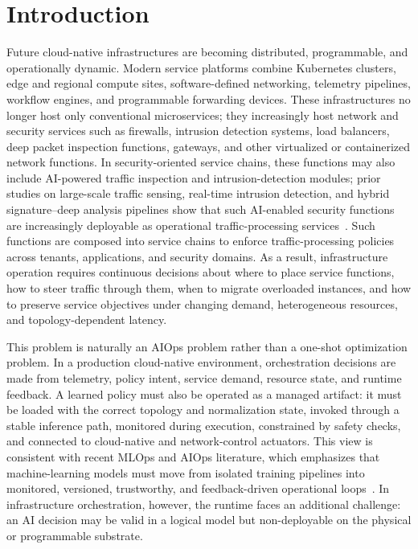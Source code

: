 \documentclass[final,5p]{elsarticle}
\begin{document}
\section{Introduction}
\label{sec:introduction}

Future cloud-native infrastructures are becoming distributed, programmable, and operationally dynamic. Modern service platforms combine Kubernetes clusters, edge and regional compute sites, software-defined networking, telemetry pipelines, workflow engines, and programmable forwarding devices. These infrastructures no longer host only conventional microservices; they increasingly host network and security services such as firewalls, intrusion detection systems, load balancers, deep packet inspection functions, gateways, and other virtualized or containerized network functions. In security-oriented service chains, these functions may also include AI-powered traffic inspection and intrusion-detection modules; prior studies on large-scale traffic sensing, real-time intrusion detection, and hybrid signature--deep analysis pipelines show that such AI-enabled security functions are increasingly deployable as operational traffic-processing services~\cite{cSDAID22}. Such functions are composed into service chains to enforce traffic-processing policies across tenants, applications, and security domains. As a result, infrastructure operation requires continuous decisions about where to place service functions, how to steer traffic through them, when to migrate overloaded instances, and how to preserve service objectives under changing demand, heterogeneous resources, and topology-dependent latency.

This problem is naturally an AIOps problem rather than a one-shot optimization problem. In a production cloud-native environment, orchestration decisions are made from telemetry, policy intent, service demand, resource state, and runtime feedback. A learned policy must also be operated as a managed artifact: it must be loaded with the correct topology and normalization state, invoked through a stable inference path, monitored during execution, constrained by safety checks, and connected to cloud-native and network-control actuators. This view is consistent with recent MLOps and AIOps literature, which emphasizes that machine-learning models must move from isolated training pipelines into monitored, versioned, trustworthy, and feedback-driven operational loops~\cite{kreuzberger2023mlops,diazdearcaya2024joint,eken2025mlops,bayram2025trustworthy,zhang2025aiopsllm,eramo2024architecture}. In infrastructure orchestration, however, the runtime faces an additional challenge: an AI decision may be valid in a logical model but non-deployable on the physical or programmable substrate.
\end{document}
